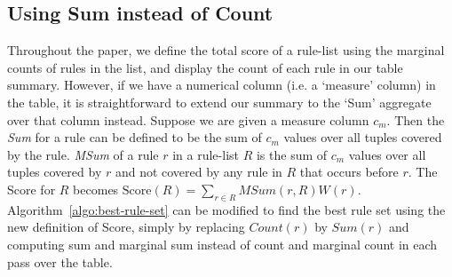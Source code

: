 \subsection{Using Sum instead of Count}\label{sec:extensions-sum}
Throughout the paper, we define the total score of a rule-list using the marginal counts of rules in the list, and display the count of each rule in our table summary. However, if we have a numerical column (i.e. a `measure' column) in the table, it is straightforward to extend our summary to the `Sum' aggregate over that column instead. Suppose we are given a measure column $c_m$. Then the {\em Sum} for a rule can be defined to be the sum of $c_m$ values over all tuples covered by the rule. {\em MSum} of a rule $r$ in a rule-list $R$ is the sum of $c_m$ values over all tuples covered by $r$ and not covered by any rule in $R$ that occurs before $r$. The Score for $R$ becomes $\text{Score}(R) = \sum_{r\in R} MSum(r,R)W(r)$. Algorithm~\ref{algo:best-rule-set} can be modified to find the best rule set using the new definition of Score, simply by replacing $Count(r)$ by $Sum(r)$ and computing sum and marginal sum instead of count and marginal count in each pass over the table.